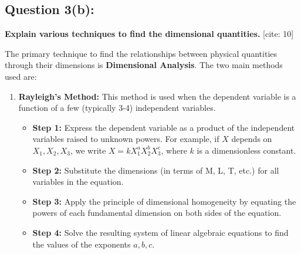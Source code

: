 \documentclass{article}
\begin{document}
\subsection*{\textbf{Question 3(b):}}
\textbf{Explain various techniques to find the dimensional quantities.} [cite: 10]

The primary technique to find the relationships between physical quantities through their dimensions is \textbf{Dimensional Analysis}. The two main methods used are:

\begin{enumerate}
    \item \textbf{Rayleigh's Method:} This method is used when the dependent variable is a function of a few (typically 3-4) independent variables.
    \begin{itemize}
        \item \textbf{Step 1:} Express the dependent variable as a product of the independent variables raised to unknown powers. For example, if $X$ depends on $X_1, X_2, X_3$, we write $X = k X_1^a X_2^b X_3^c$, where $k$ is a dimensionless constant.
        \item \textbf{Step 2:} Substitute the dimensions (in terms of M, L, T, etc.) for all variables in the equation.
        \item \textbf{Step 3:} Apply the principle of dimensional homogeneity by equating the powers of each fundamental dimension on both sides of the equation.
        \item \textbf{Step 4:} Solve the resulting system of linear algebraic equations to find the values of the exponents $a, b, c$.
    \end{itemize}


\end{enumerate}
\end{document}
